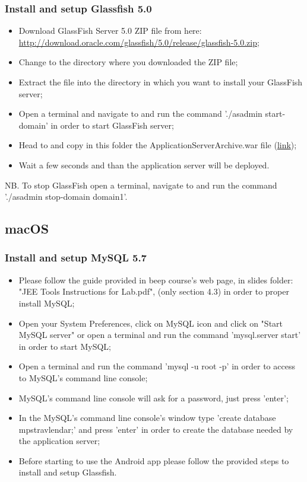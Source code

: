 \subsubsection{Install and setup Glassfish 5.0}
\begin{itemize}
	\item Download GlassFish Server 5.0 ZIP file from here: \\ \href{http://download.oracle.com/glassfish/5.0/release/glassfish-5.0.zip}{\color{blue}http://download.oracle.com/glassfish/5.0/release/glassfish-5.0.zip};
	\item Change to the directory where you downloaded the ZIP file;
	\item Extract the file into the directory in which you want to install your GlassFish server;
	\item Open a terminal and navigate to  and run the command './asadmin start-domain' in order to start GlassFish server;
	\item Head to  and copy in this folder the ApplicationServerArchive.war file (\href{https://github.com/JustSalva/MelziPinaSalvadore/tree/master/DeliveryFolder/InstallationFolder}{\color{blue}link});
	\item Wait a few seconds and than the application server will be deployed.
\end{itemize}
NB. To stop GlassFish open a terminal, navigate to  and run the command './asadmin stop-domain domain1'.

\subsection{macOS}
\label{subsect:macOS}

\subsubsection{Install and setup MySQL 5.7}
\begin{itemize}
	\item Please follow the guide provided in beep course's web page, in slides folder: "JEE Tools Instructions for Lab.pdf", (only section 4.3) in order to proper install MySQL;
	\item Open your System Preferences, click on MySQL icon and click on "Start MySQL server" or open a terminal and run the command 'mysql.server start' in order to start MySQL;
	\item Open a terminal and run the command 'mysql -u root -p' in order to access to MySQL's command line console;
	\item MySQL's command line console will ask for a password, just press 'enter';
	\item In the MySQL's command line console's window type 'create database mps\textunderscore travlendar;' and press 'enter' in order to create the database needed by the application server;
	\item Before starting to use the Android app please follow the provided steps to install and setup Glassfish.
\end{itemize}


